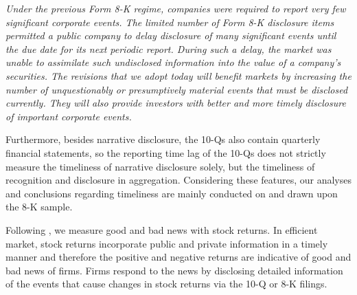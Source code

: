 \documentclass[a4paper]{article}
\begin{document}
\begin{spacing}{2}
\begin{singlespace}
	\indent \textit{Under the previous Form 8-K regime, companies were required to report very few significant corporate events. The limited number of Form 8-K disclosure items permitted a public company to delay disclosure of many significant events until the due date for its next periodic report. During such a delay, the market was unable to assimilate such undisclosed information into the value of a company's securities. The revisions that we adopt today will benefit markets by increasing the number of unquestionably or presumptively material events that must be disclosed currently. They will also provide investors with better and more timely disclosure of important corporate events.}
	\begin{flushright}
		\cite<Final Rule: Additional Form 8-K Disclosure Requirements and Acceleration of Filing Date,>[]{secFinalRuleAdditional2004}
	\end{flushright}
\end{singlespace}

Furthermore, besides narrative disclosure, the 10-Qs also contain quarterly financial statements, so the reporting time lag of the 10-Qs does not strictly measure the timeliness of narrative disclosure solely, but the timeliness of recognition and disclosure in aggregation. Considering these features, our analyses and conclusions regarding timeliness are mainly conducted on and drawn upon the 8-K sample.

Following , we measure good and bad news with stock returns. In efficient market, stock returns incorporate public and private information in a timely manner and therefore the positive and negative returns are indicative of good and bad news of firms. %
Firms respond to the news by disclosing detailed information of the events that cause changes in stock returns via the 10-Q or 8-K filings.


\end{spacing}
\end{document}
